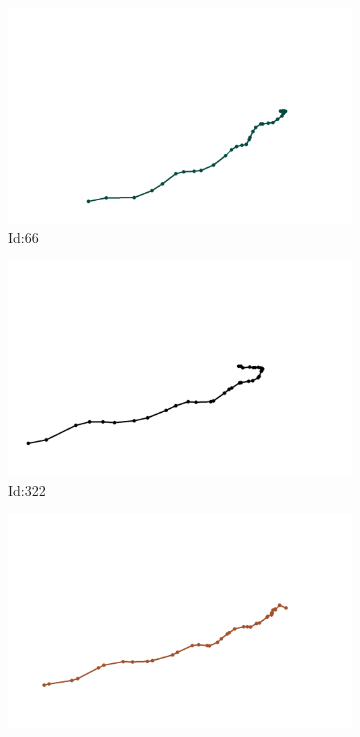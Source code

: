 \documentclass[12pt,twoside]{report}
\begin{document}
\begin{figure}
\centering
\begin{subfigure}[b]{0.20\textwidth}
\centering
\includegraphics[width=\textwidth]{../../trajectories/66.png}
\caption{Id:66}
\end{subfigure}
\begin{subfigure}[b]{0.20\textwidth}
\centering
\includegraphics[width=\textwidth]{../../trajectories/322.png}
\caption{Id:322}
\end{subfigure}
\begin{subfigure}[b]{0.20\textwidth}
\centering
\includegraphics[width=\textwidth]{../../trajectories/352.png}

\end{subfigure}
\end{figure}
\end{document}
